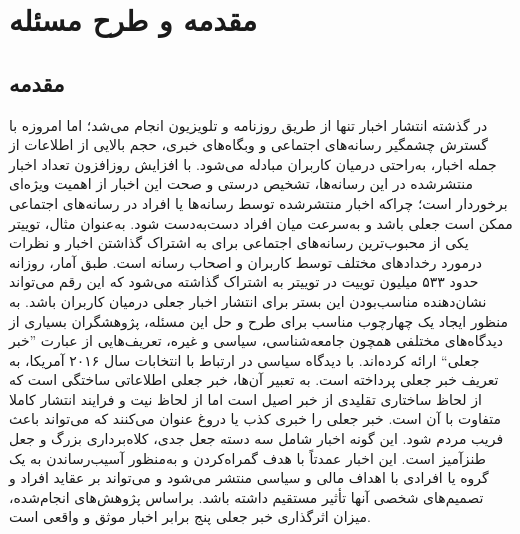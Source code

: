 \chapter{مقدمه و طرح مسئله}
\section{مقدمه}
در گذشته انتشار اخبار تنها از طریق روزنامه و تلویزیون انجام می‌شد؛ اما امروزه با گسترش چشمگیر رسانه‌های اجتماعی و  وبگاه‌های خبری، حجم بالایی از اطلاعات از جمله اخبار، به‌راحتی درمیان کاربران مبادله می‌شود. با افزایش روزافزون تعداد اخبار  منتشرشده در این رسانه‌ها، تشخیص درستی و صحت این اخبار از اهمیت ویژه‌ای برخوردار است؛ چراکه اخبار منتشرشده توسط  رسانه‌ها یا افراد در رسانه‌های اجتماعی ممکن است جعلی باشد و به‌سرعت میان افراد دست‌به‌دست شود. به‌عنوان مثال، توییتر  یکی از محبوب‌ترین رسانه‌های اجتماعی برای به اشتراک گذاشتن اخبار و نظرات درمورد رخدادهای مختلف توسط کاربران و اصحاب رسانه است. طبق آمار، روزانه حدود  ۵۳۳ میلیون توییت در توییتر به اشتراک گذاشته می‌شود که این رقم می‌تواند نشان‌دهنده مناسب‌بودن این بستر برای انتشار اخبار جعلی درمیان کاربران باشد. 
به منظور ایجاد یک چهارچوب مناسب برای طرح و حل این مسئله، پژوهشگران بسیاری از دیدگاه‌های مختلفی همچون جامعه‌شناسی، سیاسی و غیره، تعریف‌هایی از عبارت ''خبر جعلی`` ارائه کرده‌اند.
\cite{lazer2018science}
با دیدگاه سیاسی در ارتباط با انتخابات سال ۲۰۱۶ آمریکا، به تعریف خبر‌ جعلی پرداخته است. به تعبیر آن‌ها، خبر جعلی اطلاعاتی ساختگی است که از لحاظ ساختاری تقلیدی از خبر اصیل است اما از لحاظ نیت و فرایند انتشار کاملا متفاوت با آن است.
\cite{rubin2015deception}
خبر جعلی را خبری کذب یا دروغ عنوان می‌کنند که می‌تواند باعث فریب مردم شود. این گونه اخبار شامل سه دسته جعل جدی، کلاه‌برداری بزرگ و جعل طنزآمیز است. این اخبار عمدتاً با هدف گمراه‌کردن و به‌منظور آسیب‌‌رساندن به یک گروه یا افرادی با اهداف مالی و سیاسی  منتشر می‌شود و می‌تواند بر عقاید افراد و تصمیم‌های شخصی آنها تأثیر مستقیم داشته باشد. براساس پژوهش‌های انجام‌شده، میزان اثرگذاری خبر جعلی پنج برابر اخبار موثق و واقعی است.
